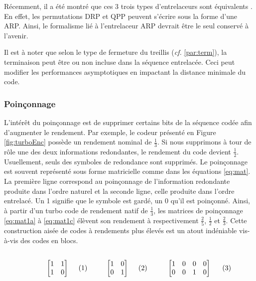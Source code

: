 Récemment, il a été montré que ces 3 trois types d'entrelaceurs sont équivalents \cite{EquivalenceInt}. En effet, les 
permutations DRP et QPP peuvent s'écrire sous la forme d'une ARP. Ainsi, le formalisme lié à l'entrelaceur ARP devrait 
être le seul conservé à l'avenir.

Il est à noter que selon le type de fermeture du treillis ({\it cf.} \ref{par:term}), la terminaison peut être ou non 
incluse dans la séquence entrelacée. Ceci peut modifier les performances asymptotiques en impactant la distance minimale 
du code.

\subsubsection{Poinçonnage}
L'intérêt du poinçonnage est de supprimer certains bits de la séquence codée afin d'augmenter le rendement. Par exemple, 
le codeur présenté en Figure \ref{fig:turboEnc} possède un rendement nominal de $\frac{1}{3}$. Si nous supprimons à tour 
de rôle une des deux informations redondantes, le rendement du code devient $\frac{1}{2}$. Usuellement, seuls des symboles 
de redondance sont supprimés. Le poinçonnage est souvent représenté sous forme matricielle comme dans les équations \ref{eq:mat}. 
La première ligne correspond au poinçonnage de l'information redondante produite dans l'ordre naturel et la seconde ligne, 
celle produite dans l'ordre entrelacé. Un 1 signifie que le symbole est gardé, un 0 qu'il est poinçonné. Ainsi, à partir 
d'un turbo code de rendement natif de $\frac{1}{3}$, les matrices de poinçonnage \ref{eq:mat1a} à \ref{eq:mat1c} élèvent 
son rendement à respectivement  $\frac{2}{5}$, $\frac{1}{2}$ et $\frac{2}{3}$. Cette construction aisée de codes à 
rendements plus élevés est un atout indéniable vis-à-vis des codes en blocs.

\begin{subequations}\label{eq:mat}
	\begin{minipage}{0.25\textwidth}
		\begin{align}
			\label{eq:mat1a}
			\begin{bmatrix}
			1 & 1 \\
			1 & 0 
			\end{bmatrix}
		\end{align}
	\end{minipage}
	\begin{minipage}{0.25\textwidth}
		\begin{align}
			\label{eq:mat1b}
			\begin{bmatrix}
			1 & 0 \\
			0 & 1 
			\end{bmatrix}
		\end{align}
	\end{minipage}
	\begin{minipage}{0.35\textwidth}
		\begin{align}
			\label{eq:mat1c}
			\begin{bmatrix}
			1 & 0 & 0 & 0 \\
			0 & 0 & 1 & 0 
			\end{bmatrix}
		\end{align}
	\end{minipage}
\end{subequations}

